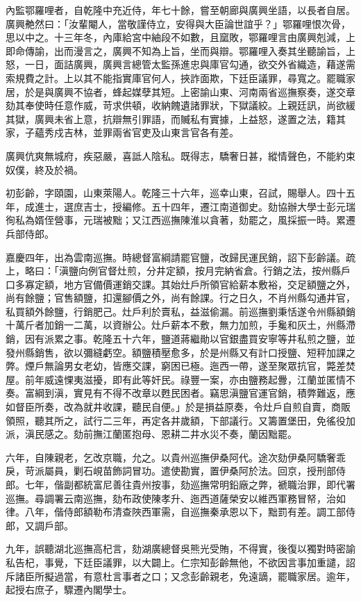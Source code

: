 \begin{pinyinscope}
內監鄂羅哩者，自乾隆中充近侍，年七十餘，嘗至朝廊與廣興坐語，以長者自居。廣興艴然曰：「汝輩閹人，當敬謹侍立，安得與大臣論世誼乎？」鄂羅哩恨次骨，思以中之。十三年冬，內庫給宮中紬段不如數，且窳敗，鄂羅哩言由廣興剋減，上即命傳諭，出而漫言之，廣興不知為上旨，坐而與辯。鄂羅哩入奏其坐聽諭旨，上怒，一日，面詰廣興，廣興言總管太監孫進忠與庫官勾通，欲交外省織造，藉遂需索規費之計。上以其不能指實庫官何人，挾詐面欺，下廷臣議罪，尋寬之。罷職家居，於是與廣興不協者，蜂起媒孽其短。上密諭山東、河南兩省巡撫察奏，遂交章劾其奉使時任意作威，苛求供頓，收納餽遺諸罪狀，下獄議絞。上親廷訊，尚欲緩其獄，廣興未省上意，抗辯無引罪語，而贓私有實據，上益怒，遂置之法，籍其家，子蘊秀戍吉林，並罪兩省官吏及山東言官各有差。

廣興伉爽無城府，疾惡嚴，喜詆人陰私。既得志，驕奢日甚，縱情聲色，不能約束奴僕，終及於禍。

初彭齡，字頤園，山東萊陽人。乾隆三十六年，巡幸山東，召試，賜舉人。四十五年，成進士，選庶吉士，授編修。五十四年，遷江南道御史。劾協辦大學士彭元瑞徇私為婿侄營事，元瑞被黜；又江西巡撫陳淮以貪著，劾罷之，風採振一時。累遷兵部侍郎。

嘉慶四年，出為雲南巡撫。時總督富綱請罷官鹽，改歸民運民銷，詔下彭齡議。疏上，略曰：「滇鹽向例官督灶煎，分井定額，按月完納省倉。行銷之法，按州縣戶口多寡定額，地方官備價運銷交課。其始灶戶所領官給薪本敷裕，交足額鹽之外，尚有餘鹽；官售額鹽，扣還腳價之外，尚有餘課。行之日久，不肖州縣勾通井官，私買額外餘鹽，行銷肥己。灶戶利於賣私，益滋偷漏。前巡撫劉秉恬遂令州縣額銷十萬斤者加銷一二萬，以資辦公。灶戶薪本不敷，無力加煎，手毚和灰土，州縣滯銷，因有派累之事。乾隆五十六年，鹽道蔣繼勛以官銀盡買安寧等井私煎之鹽，並發州縣銷售，欲以彌縫虧空。額鹽積壓愈多，於是州縣又有計口授鹽、短秤加課之弊。煙戶無論男女老幼，皆應交課，窮困已極。迤西一帶，遂至聚眾抗官，斃差焚屋。前年威遠惈夷滋擾，即有此等奸民。祿豐一案，亦由鹽務起釁，江蘭並匿情不奏。富綱到滇，實見有不得不改章以甦民困者。竊思滇鹽官運官銷，積弊難返，應如督臣所奏，改為就井收課，聽民自便。」於是損益原奏，令灶戶自煎自賣，商販領照，聽其所之，試行二三年，再定各井歲額，下部議行。又籌置堡田，免徭役加派，滇民感之。劾前撫江蘭匿抱母、恩耕二井水災不奏，蘭因黜罷。

六年，自陳親老，乞改京職，允之。以貴州巡撫伊桑阿代。途次劾伊桑阿驕奢乖戾，苛派屬員，剿石峴苗飾詞冒功。遣使勘實，置伊桑阿於法。回京，授刑部侍郎。七年，偕副都統富尼善往貴州按事，劾巡撫常明鉛廠之弊，褫職治罪，即代署巡撫。尋調署云南巡撫，劾布政使陳孝升、迤西道薩榮安以維西軍務冒帑，治如律。八年，偕侍郎額勒布清查陜西軍需，自巡撫秦承恩以下，黜罰有差。調工部侍郎，又調戶部。

九年，誤聽湖北巡撫高杞言，劾湖廣總督吳熊光受賄，不得實，後復以獨對時密諭私告杞，事覺，下廷臣議罪，以大闢上。仁宗知彭齡無他，不欲因言事加重譴，詔斥諸臣所擬過當，有意杜言事者之口；又念彭齡親老，免遠謫，罷職家居。逾年，起授右庶子，驟遷內閣學士。


\end{pinyinscope}
